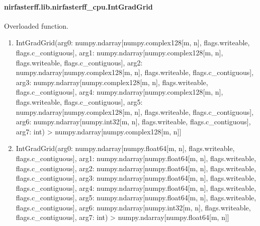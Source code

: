 \documentclass[letterpaper,10pt,english]{sphinxmanual}
\begin{document}
\sphinxstepscope


\paragraph{nirfasterff.lib.nirfasterff\_cpu.IntGradGrid}
\label{\detokenize{_autosummary/nirfasterff.lib.nirfasterff_cpu.IntGradGrid:nirfasterff-lib-nirfasterff-cpu-intgradgrid}}\label{\detokenize{_autosummary/nirfasterff.lib.nirfasterff_cpu.IntGradGrid::doc}}

\begin{fulllineitems}
\label{\detokenize{_autosummary/nirfasterff.lib.nirfasterff_cpu.IntGradGrid:nirfasterff.lib.nirfasterff_cpu.IntGradGrid}}
\pysigstartsignatures
{}
\pysigstopsignatures
\sphinxAtStartPar
Overloaded function.
\begin{enumerate}
%
\item {} 
\sphinxAtStartPar
IntGradGrid(arg0: numpy.ndarray{[}numpy.complex128{[}m, n{]}, flags.writeable, flags.c\_contiguous{]}, arg1: numpy.ndarray{[}numpy.complex128{[}m, n{]}, flags.writeable, flags.c\_contiguous{]}, arg2: numpy.ndarray{[}numpy.complex128{[}m, n{]}, flags.writeable, flags.c\_contiguous{]}, arg3: numpy.ndarray{[}numpy.complex128{[}m, n{]}, flags.writeable, flags.c\_contiguous{]}, arg4: numpy.ndarray{[}numpy.complex128{[}m, n{]}, flags.writeable, flags.c\_contiguous{]}, arg5: numpy.ndarray{[}numpy.complex128{[}m, n{]}, flags.writeable, flags.c\_contiguous{]}, arg6: numpy.ndarray{[}numpy.int32{[}m, n{]}, flags.writeable, flags.c\_contiguous{]}, arg7: int) \sphinxhyphen{}\textgreater{} numpy.ndarray{[}numpy.complex128{[}m, n{]}{]}

\item {} 
\sphinxAtStartPar
IntGradGrid(arg0: numpy.ndarray{[}numpy.float64{[}m, n{]}, flags.writeable, flags.c\_contiguous{]}, arg1: numpy.ndarray{[}numpy.float64{[}m, n{]}, flags.writeable, flags.c\_contiguous{]}, arg2: numpy.ndarray{[}numpy.float64{[}m, n{]}, flags.writeable, flags.c\_contiguous{]}, arg3: numpy.ndarray{[}numpy.float64{[}m, n{]}, flags.writeable, flags.c\_contiguous{]}, arg4: numpy.ndarray{[}numpy.float64{[}m, n{]}, flags.writeable, flags.c\_contiguous{]}, arg5: numpy.ndarray{[}numpy.float64{[}m, n{]}, flags.writeable, flags.c\_contiguous{]}, arg6: numpy.ndarray{[}numpy.int32{[}m, n{]}, flags.writeable, flags.c\_contiguous{]}, arg7: int) \sphinxhyphen{}\textgreater{} numpy.ndarray{[}numpy.float64{[}m, n{]}{]}

\end{enumerate}

\end{fulllineitems}
\end{document}
